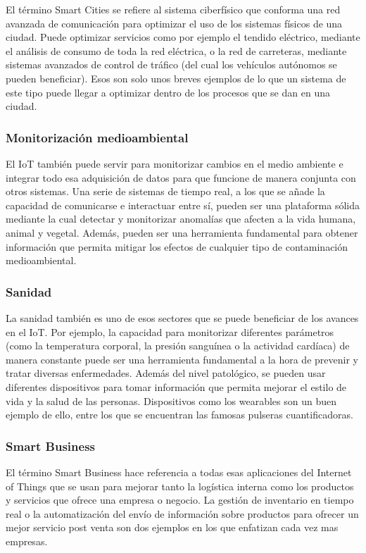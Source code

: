 El término Smart Cities se refiere al sistema ciberfísico que conforma una red avanzada de comunicación para optimizar el uso de los sistemas físicos de una ciudad. Puede optimizar servicios como por ejemplo el tendido eléctrico, mediante el análisis de consumo de toda la red eléctrica, o la red de carreteras, mediante sistemas avanzados de control de tráfico (del cual los vehículos autónomos se pueden beneficiar). Esos son solo unos breves ejemplos de lo que un sistema de este tipo puede llegar a optimizar dentro de los procesos que se dan en una ciudad.
	
\subsubsection{Monitorización medioambiental}

El IoT también puede servir para monitorizar cambios en el medio ambiente e integrar todo esa adquisición de datos para que funcione de manera conjunta con otros sistemas. Una serie de sistemas de tiempo real, a los que se añade la capacidad de comunicarse e interactuar entre sí, pueden ser una plataforma sólida mediante la cual detectar y monitorizar anomalías que afecten a la vida humana, animal y vegetal. Además, pueden ser una herramienta fundamental para obtener información que permita mitigar los efectos de cualquier tipo de contaminación medioambiental.
	
\subsubsection{Sanidad}

La sanidad también es uno de esos sectores que se puede beneficiar de los avances en el IoT. Por ejemplo, la capacidad para monitorizar diferentes parámetros (como la temperatura corporal, la presión sanguínea o la actividad cardíaca) de manera constante puede ser una herramienta fundamental a la hora de prevenir y tratar diversas enfermedades. Además del nivel patológico, se pueden usar diferentes dispositivos para tomar información que permita mejorar el estilo de vida y la salud de las personas. Dispositivos como los wearables son un buen ejemplo de ello, entre los que se encuentran las famosas pulseras cuantificadoras. 
	
\subsubsection{Smart Business}

El término Smart Business hace referencia a todas esas aplicaciones del Internet of Things que se usan para mejorar tanto la logística interna como los productos y servicios que ofrece una empresa o negocio. La gestión de inventario en tiempo real o la automatización del envío de información sobre productos para ofrecer un mejor servicio post venta son dos ejemplos en los que enfatizan cada vez mas empresas.
	
